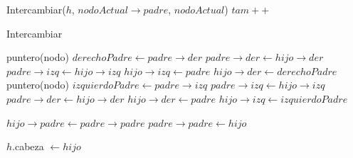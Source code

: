 \begin{Algoritmos}
\begin{algorithm}
\begin{algorithmic}[1]
    Intercambiar($h$, $nodoActual \to padre$, $nodoActual$)
    \EndWhile
   \EndIf
  \State $tam++$
 \EndProcedure
\end{algorithmic}
\end{algorithm}





\begin{algorithm}
\caption{Intercambiar}
\begin{algorithmic}[1]
    \State puntero(nodo) $derechoPadre \gets padre \to der$
    \State $padre \to der \gets hijo \to der$
    \State $padre \to izq \gets hijo \to izq$
    \State $hijo \to izq \gets padre$
    \State $hijo \to der \gets derechoPadre$
  \Else
    \State puntero(nodo) $izquierdoPadre \gets padre \to izq$
    \State $padre \to izq \gets hijo \to izq$
    \State $padre \to der \gets hijo \to der$
    \State $hijo \to der \gets padre$
    \State $hijo \to izq \gets izquierdoPadre$
  \EndIf

  \State $hijo \to padre \gets padre \to padre$
  \State $padre \to padre \gets hijo$
  
    \State$h$.cabeza $\gets hijo$
  \EndIf 


 \EndProcedure
\end{algorithmic}
\end{algorithm}










\end{Algoritmos}











